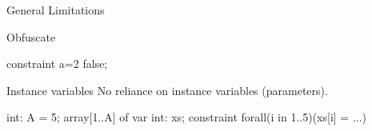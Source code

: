 \documentclass[aspectratio=169]{beamer} %
\begin{document}
\begin{frame}[fragile]{General Limitations}
  \begin{block}{Obfuscate}
    \begin{mznno}
constraint a=2 \/ false;
    \end{mznno}
  \end{block}

  \pause
  \begin{block}{Instance variables}
    No reliance on instance variables (parameters).\pause
    \begin{mznno}
int: A = 5;
array[1..A] of var int: xs;
constraint forall(i in 1..5)(xs[i] = ...)
    \end{mznno}
  \end{block}
\end{frame}
\end{document}
